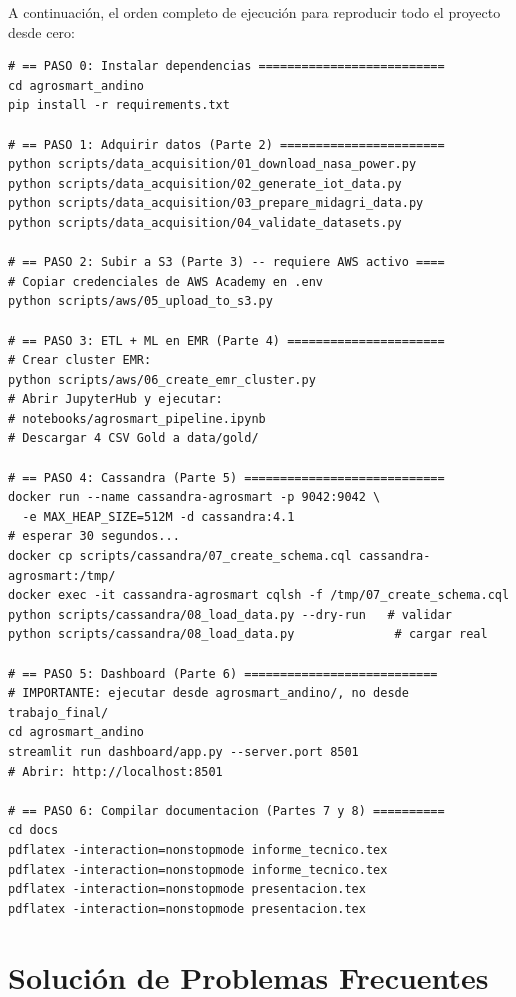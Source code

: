 \documentclass[11pt,a4paper]{article}
\begin{document}
A continuaci\'on, el orden completo de ejecuci\'on para reproducir
todo el proyecto desde cero:

\begin{lstlisting}[style=bash]
# == PASO 0: Instalar dependencias ==========================
cd agrosmart_andino
pip install -r requirements.txt

# == PASO 1: Adquirir datos (Parte 2) =======================
python scripts/data_acquisition/01_download_nasa_power.py
python scripts/data_acquisition/02_generate_iot_data.py
python scripts/data_acquisition/03_prepare_midagri_data.py
python scripts/data_acquisition/04_validate_datasets.py

# == PASO 2: Subir a S3 (Parte 3) -- requiere AWS activo ====
# Copiar credenciales de AWS Academy en .env
python scripts/aws/05_upload_to_s3.py

# == PASO 3: ETL + ML en EMR (Parte 4) ======================
# Crear cluster EMR:
python scripts/aws/06_create_emr_cluster.py
# Abrir JupyterHub y ejecutar:
# notebooks/agrosmart_pipeline.ipynb
# Descargar 4 CSV Gold a data/gold/

# == PASO 4: Cassandra (Parte 5) ============================
docker run --name cassandra-agrosmart -p 9042:9042 \
  -e MAX_HEAP_SIZE=512M -d cassandra:4.1
# esperar 30 segundos...
docker cp scripts/cassandra/07_create_schema.cql cassandra-agrosmart:/tmp/
docker exec -it cassandra-agrosmart cqlsh -f /tmp/07_create_schema.cql
python scripts/cassandra/08_load_data.py --dry-run   # validar
python scripts/cassandra/08_load_data.py              # cargar real

# == PASO 5: Dashboard (Parte 6) ===========================
# IMPORTANTE: ejecutar desde agrosmart_andino/, no desde trabajo_final/
cd agrosmart_andino
streamlit run dashboard/app.py --server.port 8501
# Abrir: http://localhost:8501

# == PASO 6: Compilar documentacion (Partes 7 y 8) ==========
cd docs
pdflatex -interaction=nonstopmode informe_tecnico.tex
pdflatex -interaction=nonstopmode informe_tecnico.tex
pdflatex -interaction=nonstopmode presentacion.tex
pdflatex -interaction=nonstopmode presentacion.tex
\end{lstlisting}

\section{Soluci\'on de Problemas Frecuentes}
\end{document}

